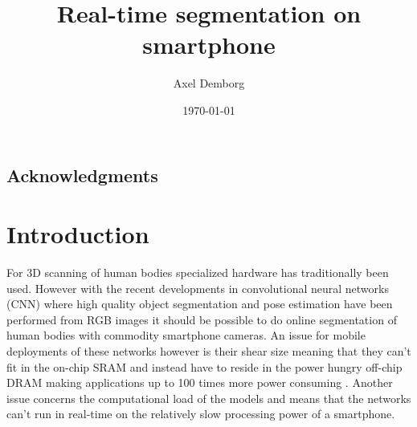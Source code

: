 \documentclass{kththesis}
\title{Real-time segmentation on smartphone}
\author{Axel Demborg}
\date{\today}
\begin{document}
\listoftodos

\frontmatter

\titlepage

\begin{abstract}

\end{abstract}


\begin{otherlanguage}{swedish}
  \begin{abstract}
  \end{abstract}
\end{otherlanguage}

\section*{Acknowledgments}




\tableofcontents


\mainmatter


\chapter{Introduction}
For 3D scanning of human bodies specialized hardware has traditionally been
used. However with the recent developments in convolutional neural networks
(CNN) where high quality object segmentation \parencite{BriefHistory} and pose
estimation \parencite{he2017mask} have been performed from RGB images it should
be possible to do online segmentation of human bodies with commodity smartphone cameras. An issue
for mobile deployments of these networks however is their shear size meaning
that they can't fit in the on-chip SRAM and instead have to reside in the power
hungry off-chip DRAM making applications up to 100 times more power consuming
\parencite{han2015learning}. Another issue concerns the computational load of
the models and means that the networks can't run in real-time on the relatively
slow processing power of a smartphone. 
\end{document}
